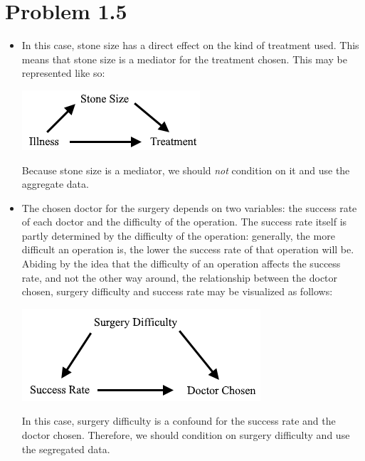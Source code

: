 \documentclass[a4paper]{article}
\begin{document}
\section*{Problem 1.5}
\begin{itemize}
    \item In this case, stone size has a direct effect on the kind of treatment used. 
    This means that stone size is a mediator for the treatment chosen. 
    This may be represented like so: 
    \begin{center}
        \includegraphics*{Images/1.5.1.png}
    \end{center}
    Because stone size is a mediator, we should \textit{not} condition on it and use the aggregate data.
    \item The chosen doctor for the surgery depends on two variables: the success rate of each doctor and the difficulty of the operation. 
    The success rate itself is partly determined by the difficulty of the operation: 
    generally, the more difficult an operation is, the lower the success rate of that operation will be. 
    Abiding by the idea that the difficulty of an operation affects the success rate, and not the other way around, 
    the relationship between the doctor chosen, surgery difficulty and success rate may be visualized as follows: 
    \begin{center}
        \includegraphics*{Images/1.5.2.png}
    \end{center}
    In this case, surgery difficulty is a confound for the success rate and the doctor chosen. 
    Therefore, we should condition on surgery difficulty and use the segregated data.
\end{itemize}
\end{document}
